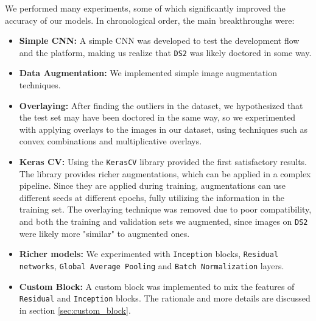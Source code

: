 \documentclass[11pt]{article}
\begin{document}
\begin{multicols}{2}
      We performed many experiments, some of which significantly improved the accuracy of our models. In chronological order, the main breakthroughs were:
      \begin{itemize}[leftmargin=*]
            \setlength\itemsep{0em}
            \item \textbf{Simple CNN:} A simple CNN was developed to test the development flow and the platform, making us realize that \texttt{DS2} was likely doctored in some way.
            \item \textbf{Data Augmentation:} We implemented simple image augmentation techniques.
            \item \textbf{Overlaying:} After finding the outliers in the dataset, we hypothesized that the test set may have been doctored in the same way, so we experimented with applying overlays to the images in our dataset, using techniques such as convex combinations and multiplicative overlays.
            \item \textbf{Keras CV:} Using the \texttt{KerasCV} library\cite{chollet2015keras} provided the first satisfactory results. The library provides richer augmentations, which can be applied in a complex pipeline. Since they are applied during training, augmentations can use different seeds at different epochs, fully utilizing the information in the training set. The overlaying technique was removed due to poor compatibility, and both the training and validation sets we augmented, since images on \texttt{DS2} were likely more "similar" to augmented ones.
            \item \textbf{Richer models:} We experimented with \texttt{In\-cep\-tion} blocks\cite{Inception}, \texttt{Re\-si\-dual net\-works}\cite{He2015DeepRL}, \texttt{Glo\-bal Aver\-age Poo\-ling} and \texttt{Batch Nor\-ma\-li\-za\-tion} layers.
            \item \textbf{Custom Block:} A custom block was implemented to mix the features of \texttt{Re\-si\-dual} and \texttt{In\-cep\-tion} blocks. The rationale and more details are discussed in section \ref{sec:custom_block}.
      \end{itemize}


\end{multicols}
\end{document}
